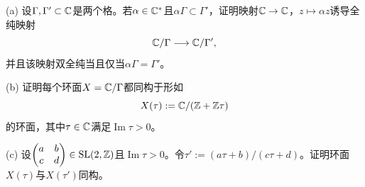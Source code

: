 (a) 设$\Gamma,\Gamma'\subset\mathbb C$是两个格。若$\alpha\in\mathbb C^*$且$\alpha\Gamma\subset\Gamma'$，证明映射$\mathbb C\to\mathbb C$，$z\mapsto\alpha z$诱导全纯映射
\[
\mathbb C/\Gamma\longrightarrow\mathbb C/\Gamma',
\]
并且该映射双全纯当且仅当$\alpha\Gamma=\Gamma'$。

(b) 证明每个环面$X=\mathbb C/\Gamma$都同构于形如
\[
X(\tau):=\mathbb C/(\mathbb Z+\mathbb Z\tau)
\]
的环面，其中$\tau\in\mathbb C$满足$\operatorname{Im}\tau>0$。

(c) 设$\begin{pmatrix}a&b\\c&d\end{pmatrix}\in\operatorname{SL}(2,\mathbb Z)$且$\operatorname{Im}\tau>0$。令$\tau':=(a\tau+b)/(c\tau+d)$。证明环面$X(\tau)$与$X(\tau')$同构。
